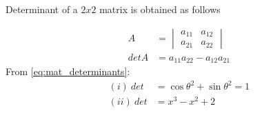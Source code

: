 \begin{flushleft}
Determinant of a $2 x 2 $ matrix is obtained as follows
\end{flushleft}
\begin{align}
A &= \begin{vmatrix} \nonumber
a_{11}& a_{12}\\
a_{21}& a_{22}
\end{vmatrix}\\
detA &= a_{11}a_{22}-a_{12}a_{21}\label{eq:mat_determinants}
\end{align}
From \ref{eq:mat_determinants}:
\begin{align}
(i)\ det &= \cos{\theta}^2 + \sin{\theta}^2 = 1 \\
(ii)\  det &= x^3 - x^2 + 2
\end{align}


